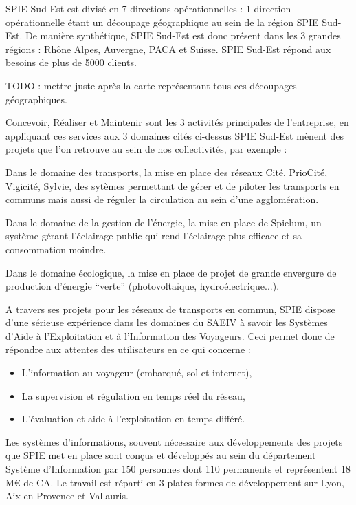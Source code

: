 SPIE Sud-Est est divisé en 7 directions opérationnelles : 1 direction opérationnelle étant un découpage géographique au sein de la région SPIE Sud-Est. De manière synthétique, SPIE Sud-Est est donc présent dans les 3 grandes régions : Rhône Alpes, Auvergne, PACA et  Suisse. SPIE Sud-Est répond aux besoins de plus de 5000 clients.

TODO : mettre juste après la carte représentant tous ces découpages géographiques.

Concevoir, Réaliser et Maintenir sont les 3 activités principales de l’entreprise, en appliquant ces services aux 3 domaines cités ci-dessus SPIE Sud-Est mènent des projets que l’on retrouve au sein de nos collectivités, par exemple :

Dans le domaine des transports, la mise en place des réseaux Cité, PrioCité, Vigicité, Sylvie,  des sytèmes permettant de gérer et de piloter les transports en communs mais aussi de réguler la circulation au sein d’une agglomération.

Dans le domaine de la gestion de l’énergie, la mise en place de Spielum, un système gérant l’éclairage public qui rend l’éclairage plus efficace et sa consommation moindre.

Dans le domaine écologique, la mise en place de projet de grande envergure de production d’énergie “verte” (photovoltaïque, hydroélectrique...).

A travers ses projets pour les réseaux de transports en commun, SPIE dispose d’une sérieuse expérience dans les domaines du SAEIV à savoir les Systèmes d’Aide à l’Exploitation et à l’Information des Voyageurs. Ceci permet donc de répondre aux attentes des utilisateurs en ce qui concerne :

\begin{itemize}
\item L’information au voyageur (embarqué, sol et internet),
\item La supervision et régulation en temps réel du réseau,
\item L’évaluation et aide à l’exploitation en temps différé.
\end{itemize}

Les systèmes d’informations, souvent nécessaire aux développements des projets que SPIE met en place sont conçus et développés au sein du département Système d’Information par 150 personnes dont 110 permanents et représentent 18 M€ de CA. Le travail est réparti en 3 plates-formes de développement sur Lyon, Aix en Provence et Vallauris.

